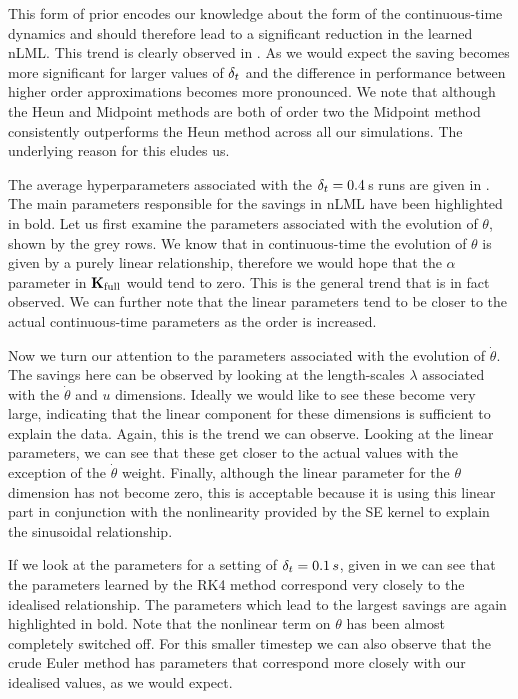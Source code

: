 This form of prior encodes our knowledge about the form of the continuous-time dynamics and should therefore lead to a significant reduction in the learned nLML. This trend is clearly observed in . As we would expect the saving becomes more significant for larger values of $\delta_t$ and the difference in performance between higher order approximations becomes more pronounced. We note that although the Heun and Midpoint methods are both of order two the Midpoint method consistently outperforms the Heun method across all our simulations. The underlying reason for this eludes us.

The average hyperparameters associated with the $\delta_t=0.4\,$s runs are given in . The main parameters responsible for the savings in nLML have been highlighted in bold. Let us first examine the parameters associated with the evolution of $\theta$, shown by the grey rows. We know that in continuous-time the evolution of $\theta$ is given by a purely linear relationship, therefore we would hope that the $\alpha$ parameter in $\mathbf{K}_{\text{full}}$ would tend to zero. This is the general trend that is in fact observed. We can further note that the linear parameters tend to be closer to the actual continuous-time parameters as the order is increased.

Now we turn our attention to the parameters associated with the evolution of $\dot\theta$. The savings here can be observed by looking at the length-scales $\lambda$ associated with the $\dot\theta$ and $u$ dimensions. Ideally we would like to see these become very large, indicating that the linear component for these dimensions is sufficient to explain the data. Again, this is the trend we can observe. Looking at the linear parameters, we can see that these get closer to the actual values with the exception of the $\dot\theta$ weight. Finally, although the linear parameter for the $\theta$ dimension has not become zero, this is acceptable because it is using this linear part in conjunction with the nonlinearity provided by the SE kernel to explain the sinusoidal relationship.

If we look at the parameters for a setting of $\delta_t=0.1\,s$, given in  we can see that the parameters learned by the RK4 method correspond very closely to the idealised relationship. The parameters which lead to the largest savings are again highlighted in bold. Note that the nonlinear term on $\theta$ has been almost completely switched off. For this smaller timestep we can also observe that the crude Euler method has parameters that correspond more closely with our idealised values, as we would expect.




